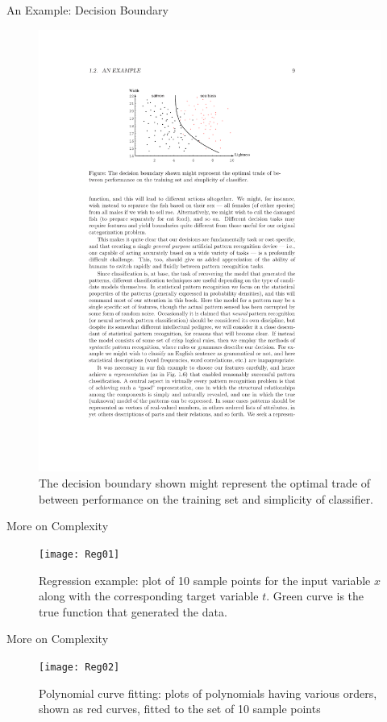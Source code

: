\begin{frame}{An Example: Decision Boundary}
\begin{figure}
\includegraphics[scale=1.1]{Figures/Ch0105}
\caption{The decision boundary shown might represent the optimal trade of between performance on the training set and simplicity of classifier.}
\end{figure}
\end{frame}

\begin{frame}{More on Complexity}
\begin{figure}
\texttt{[image: Reg01]}
\caption{Regression example: plot of 10 sample points for the input variable $x$ along with the corresponding target variable $t$. Green curve is the true function that generated the data.}
\end{figure}
\end{frame}

\begin{frame}{More on Complexity}
\begin{figure}
\texttt{[image: Reg02]}
\caption{Polynomial curve fitting: plots of polynomials having various orders, shown as red curves, fitted to the set of 10 sample points}
\end{figure}
\end{frame}

